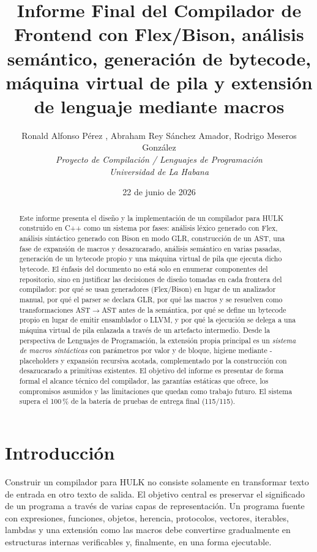 \documentclass[12pt,letterpaper]{article}
\title{Informe Final del Compilador de \hulk\\
\large Frontend con Flex/Bison, análisis semántico, generación de bytecode,
máquina virtual de pila y extensión de lenguaje mediante macros}
\author{
Ronald Alfonso Pérez , Abraham Rey Sánchez Amador, Rodrigo Meseros González\\[0.5em]
\textit{Proyecto de Compilación / Lenguajes de Programación}\\
\textit{Universidad de La Habana}
}
\date{22 de junio de 2026}
\newcommand{\repo}[1]{\texttt{\detokenize{#1}}}
\newcommand{\hulk}{\textsc{HULK}}
\begin{document}
\maketitle

\begin{abstract}
Este informe presenta el diseño y la implementación de un compilador para \hulk{}
construido en C++ como un sistema por fases: análisis léxico generado con Flex,
análisis sintáctico generado con Bison en modo GLR, construcción de un AST,
una fase de expansión de macros y desazucarado, análisis semántico en varias
pasadas, generación de un bytecode propio y una máquina virtual de pila que
ejecuta dicho bytecode. El énfasis del documento no está solo en enumerar
componentes del repositorio, sino en justificar las decisiones de diseño tomadas
en cada frontera del compilador: por qué se usan generadores (Flex/Bison) en
lugar de un analizador manual, por qué el parser se declara GLR, por qué las
macros y \repo{match} se resuelven como transformaciones AST$\to$AST antes de la
semántica, por qué se define un bytecode propio en lugar de emitir ensamblador o
LLVM, y por qué la ejecución se delega a una máquina virtual de pila enlazada a
través de un artefacto intermedio. Desde la perspectiva de Lenguajes de
Programación, la extensión propia principal es un \emph{sistema de macros
sintácticas} con parámetros por valor y de bloque, higiene mediante
\repo{$}-placeholders y expansión recursiva acotada, complementado por la
construcción \repo{match} con desazucarado a primitivas existentes. El objetivo
del informe es presentar de forma formal el alcance técnico del compilador, las
garantías estáticas que ofrece, los compromisos asumidos y las limitaciones que
quedan como trabajo futuro. El sistema supera el 100\,\% de la batería de pruebas
de entrega final (115/115).
\end{abstract}

\tableofcontents
\newpage

\section{Introducción}

Construir un compilador para \hulk{} no consiste solamente en transformar texto
de entrada en otro texto de salida. El objetivo central es preservar el
significado de un programa a través de varias capas de representación. Un
programa fuente con expresiones, funciones, objetos, herencia, protocolos,
vectores, iterables, lambdas y una extensión como las macros debe convertirse
gradualmente en estructuras internas verificables y, finalmente, en una forma
ejecutable.
\end{document}
